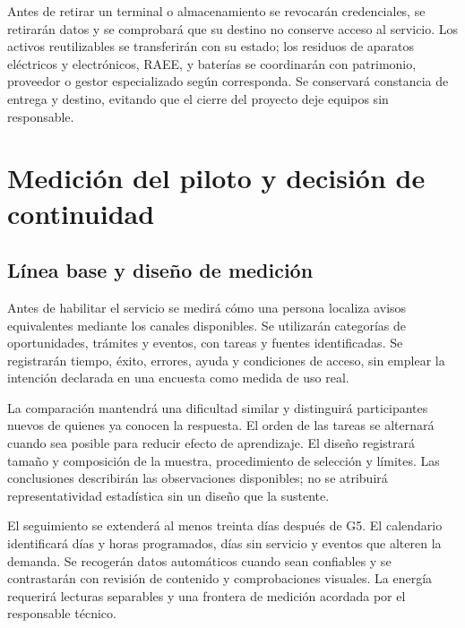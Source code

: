 Antes de retirar un terminal o almacenamiento se revocarán credenciales, se retirarán datos y se comprobará que su destino no conserve acceso al servicio. Los activos reutilizables se transferirán con su estado; los residuos de aparatos eléctricos y electrónicos, RAEE, y baterías se coordinarán con patrimonio, proveedor o gestor especializado según corresponda. Se conservará constancia de entrega y destino, evitando que el cierre del proyecto deje equipos sin responsable.

\section{Medición del piloto y decisión de continuidad}
\label{sec:int_piloto}
\subsection{Línea base y diseño de medición}
Antes de habilitar el servicio se medirá cómo una persona localiza avisos equivalentes mediante los canales disponibles. Se utilizarán categorías de oportunidades, trámites y eventos, con tareas y fuentes identificadas. Se registrarán tiempo, éxito, errores, ayuda y condiciones de acceso, sin emplear la intención declarada en una encuesta como medida de uso real.

La comparación mantendrá una dificultad similar y distinguirá participantes nuevos de quienes ya conocen la respuesta. El orden de las tareas se alternará cuando sea posible para reducir efecto de aprendizaje. El diseño registrará tamaño y composición de la muestra, procedimiento de selección y límites. Las conclusiones describirán las observaciones disponibles; no se atribuirá representatividad estadística sin un diseño que la sustente.

El seguimiento se extenderá al menos treinta días después de G5. El calendario identificará días y horas programados, días sin servicio y eventos que alteren la demanda. Se recogerán datos automáticos cuando sean confiables y se contrastarán con revisión de contenido y comprobaciones visuales. La energía requerirá lecturas separables y una frontera de medición acordada por el responsable técnico.

